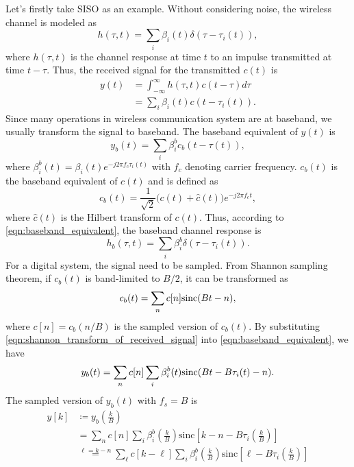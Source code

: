 Let's firstly take SISO as an example. Without considering noise, the wireless channel is modeled as \cite{tse2005fundamentals}
\begin{equation}
    h(\tau, t) = \sum_i \beta_i(t) \delta(\tau - \tau_i(t)),
\end{equation}
where $h(\tau, t)$ is the channel response at time $t$ to an impulse transmitted at time $t-\tau$. Thus, the received signal
for the transmitted $c(t)$ is
\begin{align}
    y(t) &= \int_{-\infty}^{\infty} h(\tau,t) c(t-\tau) d\tau \nonumber \\
    &= \sum_i \beta_i(t) c(t-\tau_i(t)).
\end{align}
Since many operations in wireless communication system are at baseband, we usually transform the signal to baseband. The baseband
equivalent of $y(t)$ is \cite{tse2005fundamentals}
\begin{equation} \label{eqn:baseband_equivalent}
    y_b(t) = \sum_i \beta_i^b c_b(t-\tau(t)),
\end{equation}
where $\beta_i^b(t) = \beta_i(t) e^{-j2\pi f_c \tau_i(t)}$ with $f_c$ denoting carrier frequency. $c_b(t)$ is the baseband equivalent of 
$c(t)$ and is defined as
\begin{equation}
    c_b(t) = \frac{1}{\sqrt{2}}\Big(c(t) + \hat{c}(t)\Big) e^{-j2\pi f_c t},
\end{equation}
where $\hat{c}(t)$ is the Hilbert transform of $c(t)$. Thus, according to \eqref{eqn:baseband_equivalent}, the baseband channel response is
\begin{equation}
    h_b(\tau, t) = \sum_{i} \beta_i^b \delta(\tau - \tau_i(t)).
\end{equation}
For a digital system, the signal need to be sampled. From Shannon sampling theorem, if $c_b(t)$ is band-limited to $B/2$, it
can be transformed as
\begin{equation} \label{eqn:shannon_transform_of_received_signal}
    c_b(t) = \sum_n c[n] {\rm sinc} (Bt - n),
\end{equation}
where $c[n] = c_b(n/B)$ is the sampled version of $c_b(t)$. By substituting \eqref{eqn:shannon_transform_of_received_signal}
into \eqref{eqn:baseband_equivalent}, we have
\begin{equation}
    y_b(t) = \sum_n c[n] \sum_i \beta_i^b(t) {\rm sinc}(Bt - B\tau_i(t) -n).
\end{equation}
The sampled version of $y_b(t)$ with $f_s = B$ is
\begin{align}
    y[k] & \coloneqq y_b\left( \frac{k}{B} \right) \nonumber \\ 
    & = \sum_n c[n] \sum_i \beta_i^b \left( \frac{k}{B} \right) \mathrm{sinc} \left[ k-n-B\tau_i\left( \frac{k}{B} \right) \right] \nonumber\\ 
    & \stackrel{\ell=k-n}{=} \sum_\ell c[k-\ell] \sum_i \beta_i^b \left( \frac{k}{B} \right) \mathrm{sinc} \left[\ell - B\tau_i \left( \frac{k}{B} \right) \right]
\end{align}
